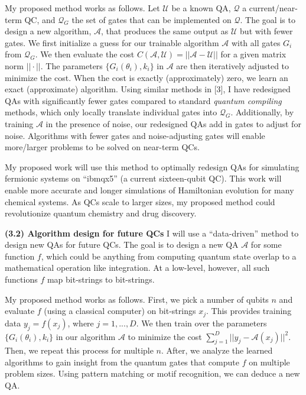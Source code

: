 \documentclass[10pt]{article}
\begin{document}
My proposed method works as follows. Let $\mathcal{U}$ be a known QA, $\mathcal{Q}$ a current/near-term QC, and $\mathcal{Q}_G$ the set of gates that can be implemented on $\mathcal{Q}$. The goal is to design a new algorithm, $\mathcal{A}$, that produces the same output as $\mathcal{U}$ but with fewer gates. We first initialize a guess for our trainable algorithm $\mathcal{A}$ with all gates $G_i$ from $\mathcal{Q}_G$. We then evaluate the cost $C(\mathcal{A}, \mathcal{U}) = || \mathcal{A} -  \mathcal{U} ||$ for a given matrix norm $|| \cdot ||$. The parameters $\{G_i(\theta_i), k_i\}$ in $\mathcal{A}$ are then iteratively adjusted to minimize the cost. When the cost is exactly (approximately) zero, we learn an exact (approximate) algorithm. Using similar methods in [3], I have redesigned QAs with significantly fewer gates compared to standard \textit{quantum compiling} methods, which only locally translate individual gates into $\mathcal{Q}_G$. Additionally, by training $\mathcal{A}$ in the presence of noise, our redesigned QAs add in gates to adjust for noise. Algorithms with fewer gates and noise-adjusting gates will enable more/larger problems to be solved on near-term QCs.


My proposed work will use this method to optimally redesign QAs for simulating fermionic systems on ``ibmqx5'' (a current sixteen-qubit QC). This work will enable more accurate and longer simulations of Hamiltonian evolution for many chemical systems. As QCs scale to larger sizes, my proposed method could revolutionize quantum chemistry and drug discovery.

\textbf{(3.2) Algorithm design for future QCs} \tab I will use a ``data-driven'' method to design new QAs for future QCs. The goal is to design a new QA $\mathcal{A}$ for some function $f$, which could be anything from computing quantum state overlap to a mathematical operation like integration. At a low-level, however, all such functions $f$ map bit-strings to bit-strings. %

My proposed method works as follows. First, we pick a number of qubits $n$ and evaluate $f$ (using a classical computer) on bit-strings $x_j$. This provides training data $y_j = f(x_j)$, where $j = 1, ..., D$. We then train over the parameters $\{G_i(\theta_i), k_i\}$ in our algorithm $\mathcal{A}$ to minimize the cost $\sum_{j = 1}^{D} ||y_j - \mathcal{A}(x_j)||^2$. Then, we repeat this process for multiple $n$. After, we analyze the learned algorithms to gain insight from the quantum gates that compute $f$ on multiple problem sizes. Using pattern matching or motif recognition, we can deduce a new QA.
\end{document}
